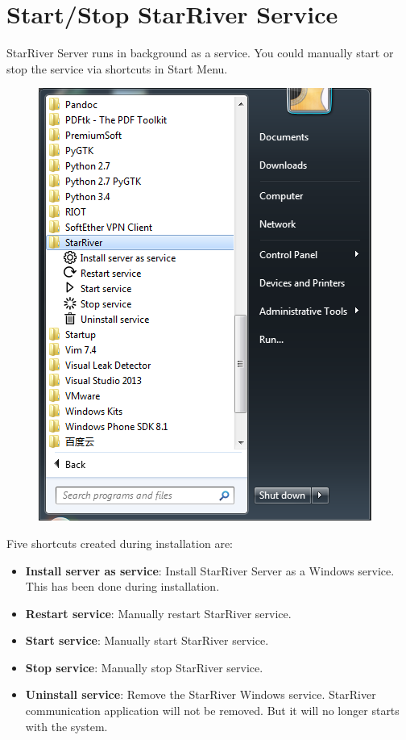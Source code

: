\section{Start/Stop StarRiver
Service}\label{startstop-starriver-service}

StarRiver Server runs in background as a service. You could manually
start or stop the service via shortcuts in Start Menu.

\begin{figure}[htbp]
\centering
\includegraphics{img/shortcuts.png}
\caption{}
\end{figure}

Five shortcuts created during installation are:

\begin{itemize}
\itemsep1pt\parskip0pt
\item
  \textbf{Install server as service}: Install StarRiver Server as a
  Windows service. This has been done during installation.
\item
  \textbf{Restart service}: Manually restart StarRiver service.
\item
  \textbf{Start service}: Manually start StarRiver service.
\item
  \textbf{Stop service}: Manually stop StarRiver service.
\item
  \textbf{Uninstall service}: Remove the StarRiver Windows service.
  StarRiver communication application will not be removed. But it will
  no longer starts with the system.
\end{itemize}
